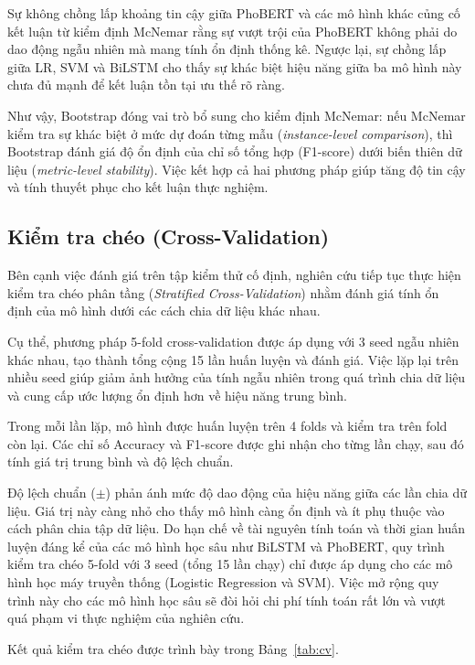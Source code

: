 \documentclass[12pt, a4paper]{report}
\begin{document}
Sự không chồng lấp khoảng tin cậy giữa PhoBERT và các mô hình khác 
củng cố kết luận từ kiểm định McNemar rằng sự vượt trội của PhoBERT 
không phải do dao động ngẫu nhiên mà mang tính ổn định thống kê. 
Ngược lại, sự chồng lấp giữa LR, SVM và BiLSTM cho thấy sự khác biệt 
hiệu năng giữa ba mô hình này chưa đủ mạnh để kết luận tồn tại 
ưu thế rõ ràng.

Như vậy, Bootstrap đóng vai trò bổ sung cho kiểm định McNemar: 
nếu McNemar kiểm tra sự khác biệt ở mức dự đoán từng mẫu 
(\textit{instance-level comparison}), thì Bootstrap đánh giá 
độ ổn định của chỉ số tổng hợp (F1-score) dưới biến thiên dữ liệu 
(\textit{metric-level stability}). Việc kết hợp cả hai phương pháp 
giúp tăng độ tin cậy và tính thuyết phục cho kết luận thực nghiệm.

\subsection{Kiểm tra chéo (Cross-Validation)}

Bên cạnh việc đánh giá trên tập kiểm thử cố định, nghiên cứu tiếp tục 
thực hiện kiểm tra chéo phân tầng (\textit{Stratified Cross-Validation}) 
nhằm đánh giá tính ổn định của mô hình dưới các cách chia dữ liệu khác nhau.

Cụ thể, phương pháp 5-fold cross-validation được áp dụng với 3 seed 
ngẫu nhiên khác nhau, tạo thành tổng cộng 15 lần huấn luyện và đánh giá. 
Việc lặp lại trên nhiều seed giúp giảm ảnh hưởng của tính ngẫu nhiên 
trong quá trình chia dữ liệu và cung cấp ước lượng ổn định hơn 
về hiệu năng trung bình.

Trong mỗi lần lặp, mô hình được huấn luyện trên 4 folds và kiểm tra 
trên fold còn lại. Các chỉ số Accuracy và F1-score được ghi nhận 
cho từng lần chạy, sau đó tính giá trị trung bình và độ lệch chuẩn.

Độ lệch chuẩn ($\pm$) phản ánh mức độ dao động của hiệu năng 
giữa các lần chia dữ liệu. Giá trị này càng nhỏ cho thấy mô hình 
càng ổn định và ít phụ thuộc vào cách phân chia tập dữ liệu.
Do hạn chế về tài nguyên tính toán và thời gian huấn luyện đáng kể của các mô hình học sâu như BiLSTM và PhoBERT, quy trình kiểm tra chéo 5-fold với 3 seed (tổng 15 lần chạy) chỉ được áp dụng cho các mô hình học máy truyền thống (Logistic Regression và SVM). Việc mở rộng quy trình này cho các mô hình học sâu sẽ đòi hỏi chi phí tính toán rất lớn và vượt quá phạm vi thực nghiệm của nghiên cứu.

Kết quả kiểm tra chéo được trình bày trong Bảng~\ref{tab:cv}.
\end{document}
